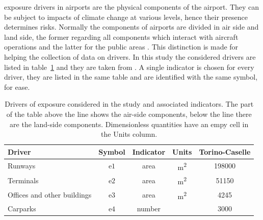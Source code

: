 \Gls{exposure} \glspl{driver} in airports are the physical components of the airport. They can be subject to \glspl{impact} of climate change at various levels, hence their presence determines \glspl{risk}. Normally the components of airports are divided in air side and land side, the former regarding all components which interact with aircraft operations and the latter for the public areas \cite[553]{2022DeVivoRiskAssessment}. This distinction is made for helping the collection of data on drivers.
In this study the considered drivers are listed in table~\ref{tab:drivers_exposure} and they are taken from \cite[554]{2022DeVivoRiskAssessment}. A single \gls{indicator} is chosen for every driver, they are listed in the same table and are identified with the same symbol, for ease.
\begin{table}[h]
  \renewcommand*{\arraystretch}{1.5}
  \centering
  \caption{Drivers of exposure considered in the study and associated indicators. The part of the table above the line shows the air-side components, below the line there are the land-side components. Dimensionless quantities have an empy cell in the Units column.}
  \label{tab:drivers_exposure}
  \begin{tabular}{p{}cccc}
    Driver                      & Symbol        & Indicator & Units                & Torino-Caselle \\
    \hline
    Runways                     & $\mathrm{e1}$ & area      & \unit{\square\metre} & 198000         \\
    \hline
    Terminals                   & $\mathrm{e2}$ & area      & \unit{\square\metre} & 51150          \\
    Offices and other buildings & $\mathrm{e3}$ & area      & \unit{\square\metre} & 4245           \\
    Carparks                    & $\mathrm{e4}$ & number    &                      & 3000           \\
  \end{tabular}
\end{table}

